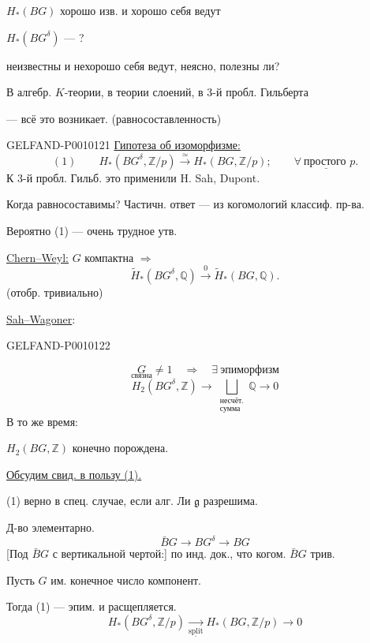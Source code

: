 $H_*(BG)$ хорошо изв. и хорошо себя ведут

$H_*(BG^\delta)$ --- ?

неизвестны и нехорошо себя ведут, неясно, полезны ли?

В алгебр. $K$-теории, в теории слоений, в 3-й пробл. Гильберта

--- всё это возникает. \qquad (равносоставленность)


\begin{GelfandAdjacentEvidence}{GELFAND-P001012}{1}
\underline{Гипотеза об изоморфизме:}
\[
(1)\qquad H_*(BG^\delta,\mathbb Z/p)\overset{\simeq}{\longrightarrow}
H_*(BG,\mathbb Z/p);\qquad \underline{\forall\ \text{простого }p.}
\]
К 3-й пробл. Гильб. это применили H. Sah, Dupont.

Когда равносоставимы? Частичн. ответ --- из когомологий классиф. пр-ва.

Вероятно (1) --- очень трудное утв.

\underline{Chern--Weyl:} $G$ компактна $\Rightarrow$
\[
\widetilde H_*(BG^\delta,\mathbb Q)\overset{0}{\longrightarrow}
\widetilde H_*(BG,\mathbb Q).
\]
(отобр. тривиально)

\underline{Sah--Wagoner}:
\end{GelfandAdjacentEvidence}
\begin{GelfandAdjacentEvidence}{GELFAND-P001012}{2}

\[
\underset{\text{связна}}{G}\ne1
\quad\Rightarrow\quad\exists\ \text{эпиморфизм}
\]
\[
H_2(BG^\delta,\mathbb Z)\longrightarrow
\underset{\substack{\text{несчёт.}\\\text{сумма}}}{\bigsqcup}\mathbb Q\longrightarrow0
\]
В то же время:
\par $H_2(BG,\mathbb Z)$ конечно порождена.

\underline{Обсудим свид. в пользу (1).}

(1) верно в спец. случае, если алг. Ли $\mathfrak g$ разрешима.

Д-во элементарно.
\[
\bar B G\longrightarrow BG^\delta\longrightarrow BG
\]
[Под $\bar B G$ с вертикальной чертой:] по инд. док., что когом. $\bar B G$ трив.

Пусть $G$ им. конечное число компонент.

Тогда (1) --- эпим. и расщепляется.
\[
H_*(BG^\delta,\mathbb Z/p)
\underset{\underline{\mathrm{split}}}{\longrightarrow}
H_*(BG,\mathbb Z/p)\longrightarrow0
\]
\end{GelfandAdjacentEvidence}
